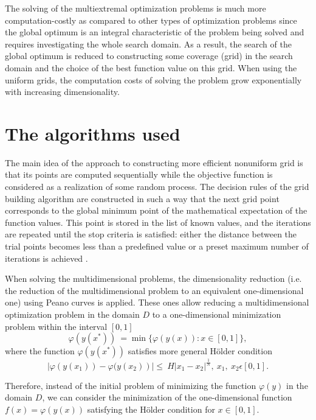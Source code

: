\documentclass{svproc}
\begin{document}
The solving of the multiextremal optimization problems is much more computation-costly  as compared  to other types of optimization problems since the global optimum is an integral characteristic of the  problem being solved and requires investigating the whole search domain. As a result, the search of the  global optimum is reduced to constructing some coverage (grid) in the search domain and the choice of  the best function value on this grid. When using the uniform grids, the computation costs of solving the  problem grow exponentially with increasing dimensionality.



\section{The algorithms used}\label{SecA}

The main idea of the approach to constructing more efficient nonuniform grid is that its points are  computed sequentially while the objective function is considered as a realization of some random process. The decision rules of the grid building algorithm are constructed in such a way that the next  grid point corresponds to the global minimum point of the mathematical expectation of the function  values. This point is stored in the list of known values, and the iterations are repeated until the stop criteria is satisfied: either the distance between the trial points becomes less than a  predefined value or a preset maximum number of iterations is achieved \cite{fio_bib10}.

When solving the multidimensional problems, the dimensionality reduction (i.e. the reduction of the  multidimensional problem to an equivalent one-dimensional one) using Peano curves is applied. These  ones allow reducing a multidimensional optimization problem in the domain $D$  to a one-dimensional  minimization problem within the interval $[0, 1]$
\begin{displaymath}
	\varphi(y(x^\ast))\ =\min\{\varphi(y(x)): x\in [0,1]\},
\end{displaymath}
where the function $\varphi(y(x^\ast))$ satisfies more general H{\"o}lder condition
\begin{displaymath}
	\left|\varphi (y \left(x_1\right))- \varphi (y \left(x_2\right)\right )|\le\ H\left|x_1-x_2\right|^\frac{1}{N},\ x_1,\ x_2\epsilon[0,1].
\end{displaymath} 


Therefore, instead of the initial problem of minimizing the function $\varphi(y)$ in the domain $D$,  we can consider the minimization of the one-dimensional function $f(x)=\varphi(y(x))$ satisfying  the H{\"o}lder condition for $ x\in [0,1]$.
\end{document}
